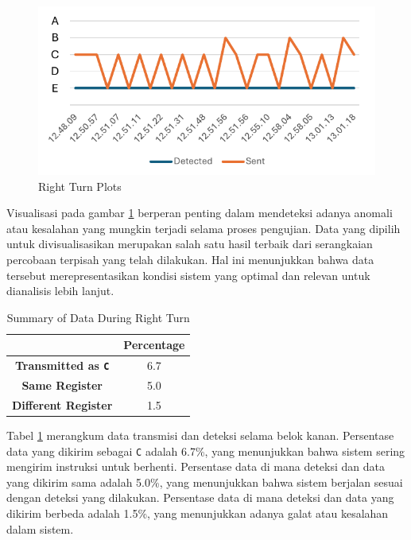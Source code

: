 \begin{figure}[H]
    \centering
    \includegraphics[width=1\textwidth]{gambar/tex/right.pdf}
    \caption{Right Turn Plots}
    \label{fig:right_turn_plots}
\end{figure}

Visualisasi pada gambar \ref{fig:right_turn_plots} berperan penting dalam mendeteksi adanya anomali atau kesalahan yang mungkin terjadi selama proses pengujian. Data yang dipilih untuk divisualisasikan merupakan salah satu hasil terbaik dari serangkaian percobaan terpisah yang telah dilakukan. Hal ini menunjukkan bahwa data tersebut merepresentasikan kondisi sistem yang optimal dan relevan untuk dianalisis lebih lanjut.

\begin{table}[H]
    \centering
    \caption{Summary of Data During Right Turn}
    \label{tab:right_turn_data_transmission_detection}
    \begin{tabular}{|c|c|}
        \hline 
        \cellcolor[HTML]{000000} & \cellcolor[HTML]{C0C0C0} \textbf{Percentage}   \\ \hline
        \cellcolor[HTML]{C0C0C0} \textbf{Transmitted as \texttt{C}} & 6.7  \\ \hline
        \cellcolor[HTML]{C0C0C0} \textbf{Same Register}  & 5.0  \\ \hline
        \cellcolor[HTML]{C0C0C0} \textbf{Different Register}   & 1.5  \\ \hline
    \end{tabular}
\end{table}

Tabel \ref{tab:right_turn_data_transmission_detection} merangkum data transmisi dan deteksi selama belok kanan. Persentase data yang dikirim sebagai \texttt{C} adalah 6.7\%, yang menunjukkan bahwa sistem sering mengirim instruksi untuk berhenti. Persentase data di mana deteksi dan data yang dikirim sama adalah 5.0\%, yang menunjukkan bahwa sistem berjalan sesuai dengan deteksi yang dilakukan. Persentase data di mana deteksi dan data yang dikirim berbeda adalah 1.5\%, yang menunjukkan adanya galat atau kesalahan dalam sistem.


